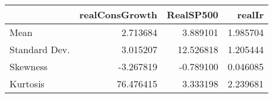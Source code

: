 \begin{tabular}{lrrr}
\toprule
{} &  realConsGrowth &  RealSP500 &    realIr \\
\midrule
Mean          &        2.713684 &   3.889101 &  1.985704 \\
Standard Dev. &        3.015207 &  12.526818 &  1.205444 \\
Skewness      &       -3.267819 &  -0.789100 &  0.046085 \\
Kurtosis      &       76.476415 &   3.333198 &  2.239681 \\
\bottomrule
\end{tabular}
